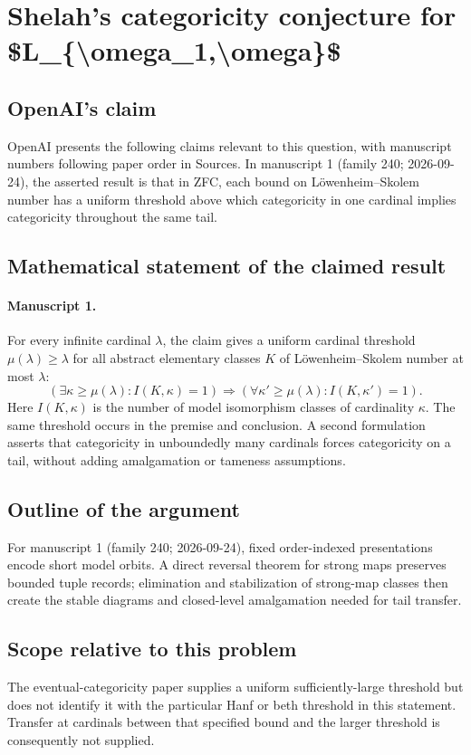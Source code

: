 \documentclass[11pt]{article}
\begin{document}
\section*{Shelah's categoricity conjecture for \$L\_\{\textbackslash{}omega\_1,\textbackslash{}omega\}\$}

\subsection{OpenAI's claim}
OpenAI presents the following claims relevant to this question, with manuscript numbers following paper order in Sources. In manuscript 1 (family 240; 2026-09-24), the asserted result is that in ZFC, each bound on L\"owenheim--Skolem number has a uniform threshold above which categoricity in one cardinal implies categoricity throughout the same tail.

\subsection{Mathematical statement of the claimed result}
\paragraph{Manuscript 1.}
For every infinite cardinal $\lambda$, the claim gives a uniform cardinal threshold $\mu(\lambda)\ge\lambda$ for all abstract elementary classes $K$ of L\"owenheim--Skolem number at most $\lambda$:
\[
 (\exists\kappa\ge\mu(\lambda):I(K,\kappa)=1)
 \Longrightarrow(\forall\kappa'\ge\mu(\lambda):I(K,\kappa')=1).
\]
Here $I(K,\kappa)$ is the number of model isomorphism classes of cardinality $\kappa$. The same threshold occurs in the premise and conclusion. A second formulation asserts that categoricity in unboundedly many cardinals forces categoricity on a tail, without adding amalgamation or tameness assumptions.

\subsection{Outline of the argument}
For manuscript 1 (family 240; 2026-09-24), fixed order-indexed presentations encode short model orbits. A direct reversal theorem for strong maps preserves bounded tuple records; elimination and stabilization of strong-map classes then create the stable diagrams and closed-level amalgamation needed for tail transfer.

\subsection{Scope relative to this problem}
The eventual-categoricity paper supplies a uniform sufficiently-large threshold but does not identify it with the particular Hanf or beth threshold in this statement. Transfer at cardinals between that specified bound and the larger threshold is consequently not supplied.
\end{document}
